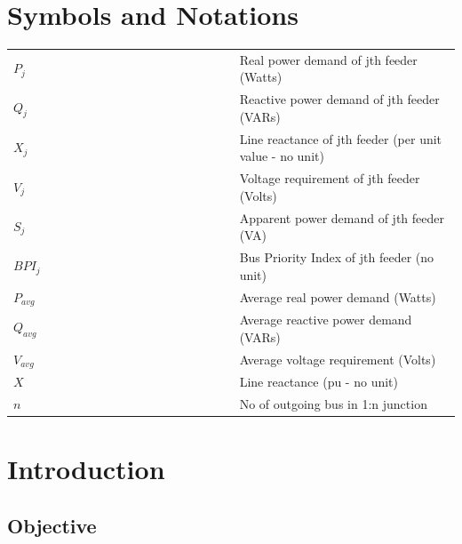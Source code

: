 \documentclass[a4paper,12pt,bibliography=totocnumbered]{report}
\begin{document}
	\chapter*{Symbols and Notations}
	\begin{table}[H]
		\centering
		\begin{tabular}{lllllllllllllllll}
			$P_{j}$   &  &  &  &  &  &  &  &  &  &  &  &  &  &  &  & Real power demand of jth feeder (Watts)                 \\
			$Q_{j}$   &  &  &  &  &  &  &  &  &  &  &  &  &  &  &  & Reactive power demand of jth feeder (VARs)              \\
			$X_{j}$   &  &  &  &  &  &  &  &  &  &  &  &  &  &  &  & Line reactance of jth feeder (per unit value - no unit) \\
			$V_{j}$   &  &  &  &  &  &  &  &  &  &  &  &  &  &  &  & Voltage requirement of jth feeder (Volts)               \\
			$S_{j}$   &  &  &  &  &  &  &  &  &  &  &  &  &  &  &  & Apparent power demand of jth feeder (VA)                \\
			$BPI_{j}$ &  &  &  &  &  &  &  &  &  &  &  &  &  &  &  & Bus Priority Index of jth feeder (no unit)              \\
			$P_{avg}$ &  &  &  &  &  &  &  &  &  &  &  &  &  &  &  & Average real power demand (Watts)                       \\
			$Q_{avg}$ &  &  &  &  &  &  &  &  &  &  &  &  &  &  &  & Average reactive power demand (VARs)                    \\
			$V_{avg}$ &  &  &  &  &  &  &  &  &  &  &  &  &  &  &  & Average voltage requirement (Volts)                     \\
			$X$    &  &  &  &  &  &  &  &  &  &  &  &  &  &  &  & Line reactance (pu - no unit)                           \\
			$n$    &  &  &  &  &  &  &  &  &  &  &  &  &  &  &  & No of outgoing bus in 1:n junction                     
		\end{tabular}
	\end{table}
	\chapter{Introduction}
	\section{Objective}
	\Blindtext
\end{document}
